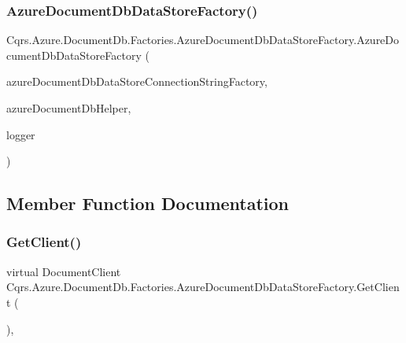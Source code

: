 \subsubsection{\texorpdfstring{Azure\+Document\+Db\+Data\+Store\+Factory()}{AzureDocumentDbDataStoreFactory()}}
{\footnotesize\ttfamily Cqrs.\+Azure.\+Document\+Db.\+Factories.\+Azure\+Document\+Db\+Data\+Store\+Factory.\+Azure\+Document\+Db\+Data\+Store\+Factory (\begin{DoxyParamCaption}\item[{\hyperlink{interfaceCqrs_1_1Azure_1_1DocumentDb_1_1Factories_1_1IAzureDocumentDbDataStoreConnectionStringFactory}{I\+Azure\+Document\+Db\+Data\+Store\+Connection\+String\+Factory}}]{azure\+Document\+Db\+Data\+Store\+Connection\+String\+Factory,  }\item[{\hyperlink{interfaceCqrs_1_1Azure_1_1DocumentDb_1_1IAzureDocumentDbHelper}{I\+Azure\+Document\+Db\+Helper}}]{azure\+Document\+Db\+Helper,  }\item[{I\+Logger}]{logger }\end{DoxyParamCaption})}



\subsection{Member Function Documentation}
\mbox{\label{classCqrs_1_1Azure_1_1DocumentDb_1_1Factories_1_1AzureDocumentDbDataStoreFactory_a4e7ff98b4f48fdc078a12f97c39d1bbb_a4e7ff98b4f48fdc078a12f97c39d1bbb}} 
\subsubsection{\texorpdfstring{Get\+Client()}{GetClient()}}
{\footnotesize\ttfamily virtual Document\+Client Cqrs.\+Azure.\+Document\+Db.\+Factories.\+Azure\+Document\+Db\+Data\+Store\+Factory.\+Get\+Client (\begin{DoxyParamCaption}{ }\end{DoxyParamCaption})\hspace{0.3cm}{\ttfamily [protected]}, {\ttfamily [virtual]}}

